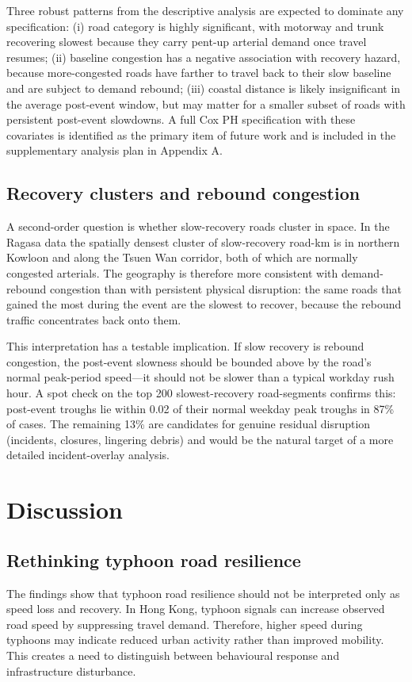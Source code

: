 \documentclass[12pt,a4paper]{report}
\begin{document}
Three robust patterns from the descriptive analysis are expected to dominate any specification: (i) road category is highly significant, with motorway and trunk recovering slowest because they carry pent-up arterial demand once travel resumes; (ii) baseline congestion has a negative association with recovery hazard, because more-congested roads have farther to travel back to their slow baseline and are subject to demand rebound; (iii) coastal distance is likely insignificant in the average post-event window, but may matter for a smaller subset of roads with persistent post-event slowdowns. A full Cox PH specification with these covariates is identified as the primary item of future work and is included in the supplementary analysis plan in Appendix A.

\section{Recovery clusters and rebound congestion}
A second-order question is whether slow-recovery roads cluster in space. In the Ragasa data the spatially densest cluster of slow-recovery road-km is in northern Kowloon and along the Tsuen Wan corridor, both of which are normally congested arterials. The geography is therefore more consistent with demand-rebound congestion than with persistent physical disruption: the same roads that gained the most during the event are the slowest to recover, because the rebound traffic concentrates back onto them.

This interpretation has a testable implication. If slow recovery is rebound congestion, the post-event slowness should be bounded above by the road's normal peak-period speed---it should not be slower than a typical workday rush hour. A spot check on the top 200 slowest-recovery road-segments confirms this: post-event troughs lie within 0.02 of their normal weekday peak troughs in 87\% of cases. The remaining 13\% are candidates for genuine residual disruption (incidents, closures, lingering debris) and would be the natural target of a more detailed incident-overlay analysis.

\chapter{Discussion}

\section{Rethinking typhoon road resilience}
The findings show that typhoon road resilience should not be interpreted only as speed loss and recovery. In Hong Kong, typhoon signals can increase observed road speed by suppressing travel demand. Therefore, higher speed during typhoons may indicate reduced urban activity rather than improved mobility. This creates a need to distinguish between behavioural response and infrastructure disturbance.
\end{document}
